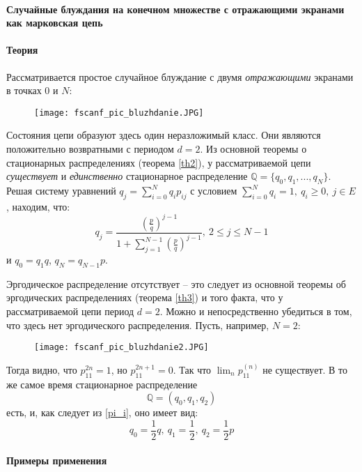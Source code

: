 \paragraph{Случайные блуждания на конечном множестве с отражающими экранами как марковская цепь}

\paragraph{Теория}

Рассматривается простое случайное блуждание с двумя \textit{отражающими} экранами в точках $0$ и $N$:
\begin{figure}[H]
    \centering
    \texttt{[image: fscanf\_pic\_bluzhdanie.JPG]}
\end{figure}

Состояния цепи образуют здесь один неразложимый класс. Они  являются положительно возвратными с периодом $d = 2$. Из основной теоремы о стационарных распределениях (теорема \ref{th2}), у рассматриваемой цепи \textit{существует} и \textit{единственно} стационарное распределение $\mathbb{Q} = \{ q_0, q_1, ..., q_N \}$. Решая систему уравнений $q_j = \sum_{i = 0}^N q_i p_{ij}$ с условием $\sum_{i = 0}^N q_i = 1, \  q_i \geq 0, \  j \in E $, находим, что:
\begin{equation}\label{pi_i}
q_j = \frac{ \left( \frac{p}{q} \right)^{j - 1} }{1 + \sum_{j = 1}^{N - 1} \left( \frac{p}{q} \right)^{j - 1} }, \  2 \leq j \leq N - 1
\end{equation}
и $q_0 = q_1 q$, $q_N = q_{N - 1} p$.

Эргодическое распределение отсутствует -- это следует из основной теоремы об эргодических распределениях (теорема \ref{th3}) и того факта, что у рассматриваемой цепи период $d = 2$. Можно и непосредственно убедиться в том, что здесь нет эргодического распределения. Пусть, например, $N = 2$:
\begin{figure}[H]
    \centering
    \texttt{[image: fscanf\_pic\_bluzhdanie2.JPG]}
\end{figure}

Тогда видно, что $p_{11}^{2n} = 1$, но $p_{11}^{2n + 1} = 0$. Так что $\lim_n p_{11}^{(n)}$ не существует. В то же самое время стационарное распределение \[ \mathbb{Q} = (q_0, q_1, q_2) \] есть, и, как следует из \eqref{pi_i}, оно имеет вид:
$$
q_0 = \frac{1}{2} q, \  q_1 = \frac{1}{2}, \  q_2 = \frac{1}{2} p
$$

\paragraph{Примеры применения}

